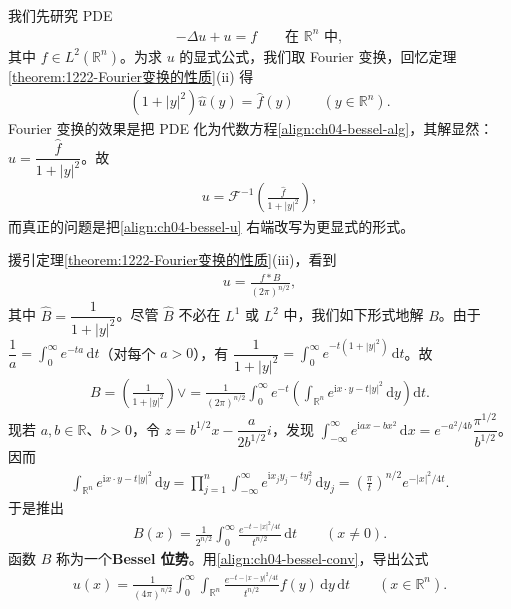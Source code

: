 \documentclass[../../main.tex]{subfiles}
\begin{document}
\begin{example}[Bessel 位势]\label{example:ch04-bessel}我们先研究 PDE
\begin{align}\label{align:ch04-bessel-pde}
-\Delta u+u=f \qquad\text{在 }\mathbb{R}^n\text{ 中},
\end{align}
其中 $f\in L^2(\mathbb{R}^n)$。为求 $u$ 的显式公式，我们取 Fourier 变换，回忆定理\cref{theorem:1222-Fourier变换的性质}(ii) 得
\begin{align}\label{align:ch04-bessel-alg}
(1+|y|^2)\widehat{u}(y)=\widehat{f}(y) \qquad(y\in\mathbb{R}^n).
\end{align}
Fourier 变换的效果是把 PDE 化为代数方程\eqref{align:ch04-bessel-alg}，其解显然：$\widehat{u}=\dfrac{\widehat{f}}{1+|y|^2}$。故
\begin{align}\label{align:ch04-bessel-u}
u=\mathcal{F}^{-1}\!\left(\frac{\widehat{f}}{1+|y|^2}\right),
\end{align}
而真正的问题是把\eqref{align:ch04-bessel-u} 右端改写为更显式的形式。

援引定理\cref{theorem:1222-Fourier变换的性质}(iii)，看到
\begin{align}\label{align:ch04-bessel-conv}
u=\frac{f*B}{(2\pi)^{n/2}},
\end{align}
其中 $\widehat{B}=\dfrac{1}{1+|y|^2}$。尽管 $\widehat{B}$ 不必在 $L^1$ 或 $L^2$ 中，我们如下形式地解 $B$。由于 $\dfrac{1}{a}=\int_0^\infty e^{-ta}\,\mathrm{d}t$（对每个 $a>0$），有 $\dfrac{1}{1+|y|^2}=\int_0^\infty e^{-t(1+|y|^2)}\,\mathrm{d}t$。故
\begin{align*}
B=\left(\frac{1}{1+|y|^2}\right)\!\vee=\frac{1}{(2\pi)^{n/2}}\int_0^\infty e^{-t}\left(\int_{\mathbb{R}^n}e^{\mathrm{i}x\cdot y-t|y|^2}\,\mathrm{d}y\right)\mathrm{d}t.
\end{align*}
现若 $a,b\in\mathbb{R}$、$b>0$，令 $z=b^{1/2}x-\dfrac{a}{2b^{1/2}}i$，发现 $\int_{-\infty}^\infty e^{\mathrm{i}ax-bx^2}\,\mathrm{d}x=e^{-a^2/4b}\dfrac{\pi^{1/2}}{b^{1/2}}$。因而
\begin{align}\label{align:ch04-gauss-integral}
\int_{\mathbb{R}^n}e^{\mathrm{i}x\cdot y-t|y|^2}\,\mathrm{d}y=\prod_{j=1}^n\int_{-\infty}^\infty e^{\mathrm{i}x_j y_j-t y_j^2}\,\mathrm{d}y_j=\left(\frac{\pi}{t}\right)^{n/2}e^{-|x|^2/4t}.
\end{align}
于是推出
\begin{align}\label{align:ch04-bessel-kernel}
B(x)=\frac{1}{2^{n/2}}\int_0^\infty\frac{e^{-t-|x|^2/4t}}{t^{n/2}}\,\mathrm{d}t \qquad(x\neq 0).
\end{align}
函数 $B$ 称为一个\textbf{Bessel 位势}。用\eqref{align:ch04-bessel-conv}，导出公式
\begin{align}\label{align:ch04-bessel-formula}
u(x)=\frac{1}{(4\pi)^{n/2}}\int_0^\infty\int_{\mathbb{R}^n}\frac{e^{-t-|x-y|^2/4t}}{t^{n/2}}f(y)\,\mathrm{d}y\,\mathrm{d}t \qquad(x\in\mathbb{R}^n).
\end{align}
\end{example}
\end{document}
